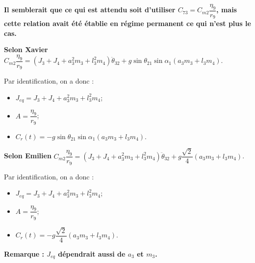\documentclass[10pt,fleqn]{article} %
\begin{document}
\textbf{Il semblerait que ce qui est attendu soit d'utiliser ${C_{73}}=C_{m2}\dfrac{\eta_9}{r_9}$, mais cette relation avait été établie en régime permanent ce qui n'est plus le cas. } 


\textbf{Selon Xavier}
$ C_{m2}\dfrac{\eta_9}{r_9}=  \left(J_3+J_4  + a_3^2 m_3  +l_3^2 m_4 \right) \ddot{\theta}_{32} + g  \sin \theta_{21}   \sin \alpha_1 \left( a_3 m_3 + l_3 m_4\right) $.

Par identification, on a donc :
\begin{itemize}
\item $J_{eq} = J_3+J_4  + a_3^2 m_3  +l_3^2 m_4$;
\item $A  =\dfrac{\eta_9}{r_9}$;
\item $C_r(t)=-g  \sin \theta_{21}   \sin \alpha_1 \left( a_3 m_3 + l_3 m_4\right) $.
\end{itemize}

\textbf{Selon Emilien}
$ C_{m2}\dfrac{\eta_9}{r_9}=  \left(J_3+J_4  + a_3^2 m_3  +l_3^2 m_4 \right) \ddot{\theta}_{32} + g \dfrac{\sqrt{2}}{4} \left( a_3 m_3 + l_3 m_4\right) $.

Par identification, on a donc :
\begin{itemize}
\item $J_{eq} = J_3+J_4  + a_3^2 m_3  +l_3^2 m_4$;
\item $A  =\dfrac{\eta_9}{r_9}$;
\item $C_r(t)=-g  \dfrac{\sqrt{2}}{4} \left( a_3 m_3 + l_3 m_4\right) $.
\end{itemize}

\textbf{Remarque :  $J_{eq}$ dépendrait aussi de $a_3$ et $m_3$.}
%
%
%
\end{document}
